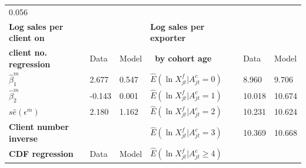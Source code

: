 \documentclass[12pt,titlepage]{article}
\begin{document}
\begin{table}
{\begin{tabular}{llllll}
        {0.056} \\
        \textbf{Log sales per client on}                                               &                                                &               & \textbf{Log sales per exporter} &
                                                                                       & \\
        \textbf{client no. regression}                                                 & {Data}                                         &
        {Model}                                                                        & \textbf{\ by cohort age }                      & {
        Data}                                                                          & {Model} \\ \hline
        $\widehat{\beta }_{1}^{m}$                                                     & {2.677}                                        & {
        0.547}                                                                         & $\widehat{E}(\ln X_{jt}^{f}|A_{jt}^{c}=0)$     & {
        8.960}                                                                         & {9.706} \\
        $\widehat{\beta }_{2}^{m}$                                                     & {-0.143}                                       & {
        0.001}                                                                         & $\widehat{E}(\ln X_{jt}^{f}|A_{jt}^{c}=1)$     & {
        10.018}                                                                        & {10.674} \\
        $s\widehat{e}(\epsilon ^{m})$                                                  & {2.180}                                        &
        {1.162}                                                                        & $\widehat{E}(\ln X_{jt}^{f}|A_{jt}^{c}=2)$     &
        {10.231}                                                                       & {10.624} \\
        \textbf{Client number inverse}                                                 & {}                                             & {}
                                                                                       & $\widehat{E}(\ln X_{jt}^{f}|A_{jt}^{c}=3)$     & {10.369}      &
        {10.668} \\
        \textbf{CDF regression}                                                        & {Data}                                         & {Model
        }                                                                              & $\widehat{E}(\ln X_{jt}^{f}|A_{jt}^{c}\geq 4)$ & {
}
\end{tabular}}
\end{table}
\end{document}
